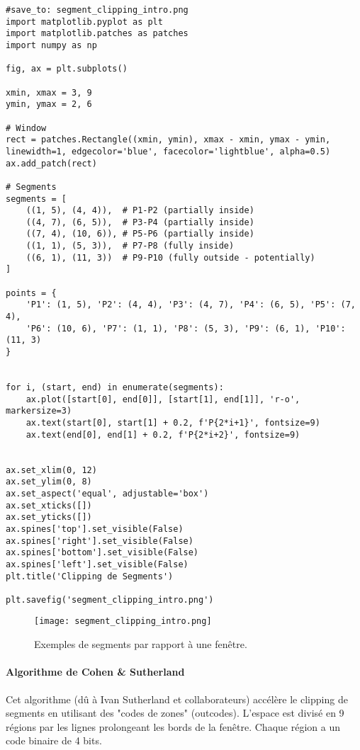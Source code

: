 \documentclass{article}
\begin{document}
\begin{verbatim}
#save_to: segment_clipping_intro.png
import matplotlib.pyplot as plt
import matplotlib.patches as patches
import numpy as np

fig, ax = plt.subplots()

xmin, xmax = 3, 9
ymin, ymax = 2, 6

# Window
rect = patches.Rectangle((xmin, ymin), xmax - xmin, ymax - ymin, linewidth=1, edgecolor='blue', facecolor='lightblue', alpha=0.5)
ax.add_patch(rect)

# Segments
segments = [
    ((1, 5), (4, 4)),  # P1-P2 (partially inside)
    ((4, 7), (6, 5)),  # P3-P4 (partially inside)
    ((7, 4), (10, 6)), # P5-P6 (partially inside)
    ((1, 1), (5, 3)),  # P7-P8 (fully inside)
    ((6, 1), (11, 3))  # P9-P10 (fully outside - potentially)
]

points = {
    'P1': (1, 5), 'P2': (4, 4), 'P3': (4, 7), 'P4': (6, 5), 'P5': (7, 4),
    'P6': (10, 6), 'P7': (1, 1), 'P8': (5, 3), 'P9': (6, 1), 'P10': (11, 3)
}


for i, (start, end) in enumerate(segments):
    ax.plot([start[0], end[0]], [start[1], end[1]], 'r-o', markersize=3)
    ax.text(start[0], start[1] + 0.2, f'P{2*i+1}', fontsize=9)
    ax.text(end[0], end[1] + 0.2, f'P{2*i+2}', fontsize=9)


ax.set_xlim(0, 12)
ax.set_ylim(0, 8)
ax.set_aspect('equal', adjustable='box')
ax.set_xticks([])
ax.set_yticks([])
ax.spines['top'].set_visible(False)
ax.spines['right'].set_visible(False)
ax.spines['bottom'].set_visible(False)
ax.spines['left'].set_visible(False)
plt.title('Clipping de Segments')

plt.savefig('segment_clipping_intro.png')
\end{verbatim}

\begin{figure}[H]
\centering
\texttt{[image: segment\_clipping\_intro.png]}
\caption{Exemples de segments par rapport à une fenêtre.}
\label{fig:segment_clipping_intro}
\end{figure}

\paragraph{Algorithme de Cohen \& Sutherland}
Cet algorithme (dû à Ivan Sutherland et collaborateurs) accélère le clipping de segments en utilisant des "codes de zones" (outcodes). L'espace est divisé en 9 régions par les lignes prolongeant les bords de la fenêtre. Chaque région a un code binaire de 4 bits.
\end{document}
